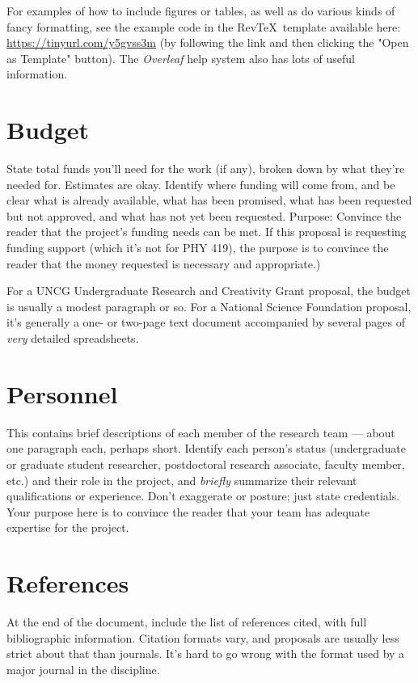 \documentclass[%
 reprint,
 amsmath,amssymb,
 aps,
]{revtex4-2}
\begin{document}
For examples of how to include figures or tables, as well as do various kinds of fancy formatting, see the example code in the Rev\TeX\ template available here: \url{https://tinyurl.com/y5gvss3m} (by following the link and then clicking the "Open as Template" button). The \textit{Overleaf} help system also has lots of useful information.

\section{Budget}

State total funds you'll need for the work (if any), broken down by what they're needed for. Estimates are okay. Identify where funding will come from, and be clear what is already available, what has been promised, what has been requested but not approved, and what has not yet been requested. Purpose: Convince the reader that the project's funding needs can be met. If this proposal is requesting funding support (which it's not for PHY 419), the purpose is to convince the reader that the money requested is necessary and appropriate.)

For a UNCG Undergraduate Research and Creativity Grant proposal, the budget is usually a modest paragraph or so. For a National Science Foundation proposal, it's generally a one- or two-page text document accompanied by several pages of \textit{very} detailed spreadsheets.

\section{Personnel}

This contains brief descriptions of each member of the research team --- about one paragraph each, perhaps short. Identify each person's status (undergraduate or graduate student researcher, postdoctoral research associate, faculty member, etc.) and their role in the project, and \textit{briefly} summarize their relevant qualifications or experience. Don't exaggerate or posture; just state credentials. Your purpose here is to convince the reader that your team has adequate expertise for the project.

\section{References}

At the end of the document, include the list of references cited, with full bibliographic information. Citation formats vary, and proposals are usually less strict about that than journals. It's hard to go wrong with the format used by a major journal in the discipline.
\end{document}
